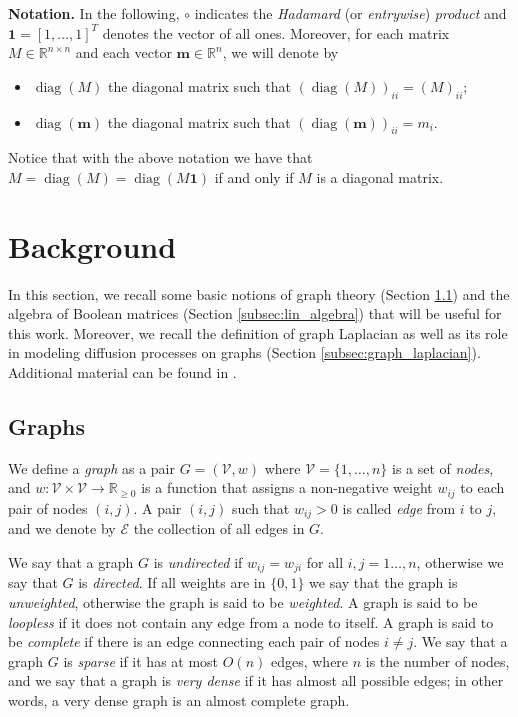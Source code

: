 \documentclass[a4paper,12pt]{article}
\DeclareMathOperator{\diag}{diag}
\newcommand{\R}{\mathbb{R}}
\newcommand{\cE}{\mathcal{E}}
\newcommand{\cV}{\mathcal{V}}
\newcommand{\onevec}{\mathbf{1}}
\begin{document}
\noindent\textbf{Notation.} In the following, $ \circ $ indicates the \emph{Hadamard} (or \emph{entrywise}) \emph{product} and $\mathbf{1}=[1,\dots,1]^T$ denotes the vector of all ones. Moreover, for each matrix $M\in\R^{n \times n}$ and each vector $\mathbf{m}\in \R^{n}$, we will denote by 
\begin{itemize}
    \item $\diag(M)$ the diagonal matrix such that $(\diag(M))_{ii}=(M)_{ii}$;
    \item $\diag(\mathbf{m})$ the diagonal matrix such that $(\diag(\mathbf{m}))_{ii}=m_{i}$. 
\end{itemize}
Notice that with the above notation we have that $M = \diag(M) = \diag(M\onevec)$ if and only if $M$ is a diagonal matrix. 

\section{Background} \label{sec:basics}

In this section, we recall some basic notions of graph theory (Section \ref{subsec:graphs}) and the algebra of Boolean matrices (Section \ref{subsec:lin_algebra}) that will be useful for this work. Moreover, we recall the definition of graph Laplacian as well as its role in modeling diffusion processes on graphs (Section \ref{subsec:graph_laplacian}). Additional material can be found in \cite{harary1969graph,kim_boolean_1982,Bullo_lectures}.


\subsection{Graphs} \label{subsec:graphs}

We define a \emph{graph} as a pair $G = (\cV, w)$ where $\cV=\{1,\dots,n\}$ is a set of \emph{nodes}, and $w:\cV \times \cV \longrightarrow \R_{\geq 0}$ is a function that assigns a non-negative weight $w_{ij}$ to each pair of nodes $(i, j)$. A pair $(i, j)$ such that $w_{ij} > 0$ is called \emph{edge} from $i$ to $j$, and we denote by $\cE$ the collection of all edges in $G$.

We say that a graph $G$ is \emph{undirected} if $w_{ij}=w_{ji}$ for all $i,j=1\dots,n$, otherwise we say that $G$ is \emph{directed}. If all weights are in $\{0,1\}$ we say that the graph is \emph{unweighted}, otherwise the graph is said to be \emph{weighted}. A graph is said to be \emph{loopless} if it does not contain any edge from a node to itself. A graph is said to be \emph{complete} if there is an edge connecting each pair of nodes $i\neq j$. 
 We say that a graph $G$ is \emph{sparse} if it has at most $O(n)$ edges, where $n$ is the number of nodes, and we say that a graph is \emph{very dense} if it has almost all possible edges; in other words, a very dense graph is an almost complete graph.
\end{document}
